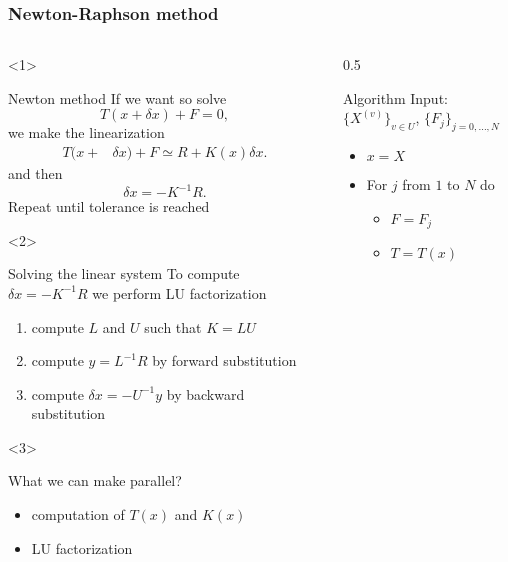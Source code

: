 \documentclass[10pt]{beamer}
\theoremstyle{definition}
\begin{document}
\begin{frame}

\frametitle{Newton-Raphson method}

\begin{columns}
\begin{column}{0.45\textwidth}
\begin{onlyenv}<1>
\begin{block}{Newton method}
If we want so solve
\[
T(x+\delta x)+F=0,
\]
we make the linearization
\[
\begin{split}
T(x+&\delta x)+F\simeq R+K(x)\delta x.
\end{split}
\]
and then
\[
\delta x=-K^{-1}R.
\]
Repeat until tolerance is reached
\end{block}
\end{onlyenv}
\begin{onlyenv}<2>
\begin{block}{Solving the linear system}
To compute $\delta x=-K^{-1}R$ we perform LU factorization
\begin{enumerate}
\item compute $L$ and $U$ such that $K=LU$
\item compute $y=L^{-1}R$ by forward substitution
\item compute $\delta x=-U^{-1}y$ by backward substitution
\end{enumerate}
\end{block}
\end{onlyenv}
\begin{onlyenv}<3>
\begin{block}{What we can make parallel?}
\begin{itemize}
\item computation of $T(x)$ and $K(x)$
\item LU factorization
\end{itemize}
\end{block}
\end{onlyenv}
\end{column}
\begin{column}{0.5\framewidth}
\begin{block}{Algorithm}
Input: $\{X^{(v)}\}_{v\in U}$, $\{F_j\}_{j=0,\dots,N}$
\begin{itemize}
\item $x=X$
\item For $j$ from $1$ to $N$ do\\
\begin{itemize}
\item $F=F_j$
\item $T=T(x)$

\end{itemize}
\end{itemize}
\end{block}
\end{column}
\end{columns}
\end{frame}
\end{document}

